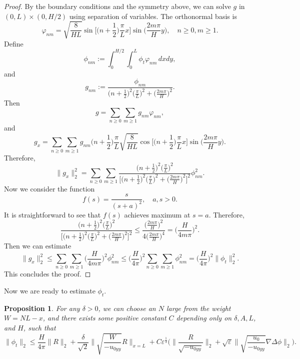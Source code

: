 \documentclass[reqno, 11pt]{amsart}
\theoremstyle{plain}
\newtheorem{proposition}[theorem]{Proposition}
\theoremstyle{definition}
\theoremstyle{remark}
\numberwithin{equation}{section}
\begin{document}
\begin{proof}
By the boundary conditions and the symmetry above, we can solve $g$ in $(0,L) \times (0, H/2)$ using separation of variables. The orthonormal basis is
$$
\varphi_{nm} = \sqrt{\frac{8}{HL}} \sin \Big[ \Big( n + \frac{1}{2} \Big) \frac{\pi}{L} x \Big] \sin \Big( \frac{2m\pi}{H} y \Big), \quad n \ge 0, m \ge 1.
$$
Define
$$
\phi_{nm}:= \int_0^{H/2} \int_0^L \phi_t \varphi_{nm} \, dx dy,
$$
and
$$
g_{nm} := \frac{\phi_{nm}}{\Big( n + \frac{1}{2} \Big)^2 \Big(\frac{\pi}{L}\Big)^2 + \Big( \frac{2m\pi}{H} \Big)^2 }.
$$
Then
$$
g = \sum_{n \ge 0} \sum_{m \ge 1} g_{nm} \varphi_{nm},
$$ 
and
$$
g_x = \sum_{n \ge 0} \sum_{m \ge 1} g_{nm} \Big( n + \frac{1}{2} \Big)  \frac{\pi}{L} \sqrt{\frac{8}{HL}} \cos \Big[ \Big( n + \frac{1}{2} \Big) \frac{\pi}{L} x \Big] \sin \Big( \frac{2m\pi}{H} y \Big).
$$
Therefore,
$$
\|g_x\|_2^2 = \sum_{n \ge 0} \sum_{m \ge 1} \frac{\Big( n + \frac{1}{2} \Big)^2 \Big(\frac{\pi}{L}\Big)^2}{\Big[ \Big( n + \frac{1}{2} \Big)^2 \Big(\frac{\pi}{L}\Big)^2 + \Big( \frac{2m\pi}{H} \Big)^2 \Big]^2} \phi_{nm}^2.
$$
Now we consider the function 
$$
f(s) = \frac{s}{(s + a)^2}, \quad a,s > 0.
$$
It is straightforward to see that $f(s)$ achieves maximum at $s = a$. Therefore,
$$
\frac{\Big( n + \frac{1}{2} \Big)^2 \Big(\frac{\pi}{L}\Big)^2}{\Big[ \Big( n + \frac{1}{2} \Big)^2 \Big(\frac{\pi}{L}\Big)^2 + \Big( \frac{2m\pi}{H} \Big)^2 \Big]^2} \le \frac{\Big( \frac{2m\pi}{H} \Big)^2}{4\Big( \frac{2m\pi}{H} \Big)^4} = \Big( \frac{H}{4m\pi}\Big)^2.
$$
Then we can estimate
$$
\|g_x\|_2^2 \le \sum_{n \ge 0} \sum_{m \ge 1} \Big( \frac{H}{4m\pi}\Big)^2 \phi_{nm}^2 \le \Big( \frac{H}{4\pi}\Big)^2 \sum_{n \ge 0} \sum_{m \ge 1} \phi_{nm}^2 = \Big( \frac{H}{4\pi}\Big)^2 \|\phi_t\|_2^2.
$$
This concludes the proof.
\end{proof}
Now we are ready to estimate $\phi_t$.
\begin{proposition}\label{prop:phi_t}
For any $\delta > 0$, we can choose an $N$ large from the weight $W = NL - x$, and there exists some positive constant $C$ depending only on $\delta, A, L$, and $H$, such that
\begin{equation}\label{est:phi_t}
\|\phi_t\|_2 \le \frac{H}{4\pi}\|R\|_2 + \frac{\delta}{\sqrt{2}} \| \sqrt{\frac{W}{-u_{0yy}}} R\|_{x= L} + C \varepsilon^{\frac{1}{3}}  \Big( \|\frac{R}{\sqrt{-u_{0yy}}}\|_2 + \sqrt{\varepsilon} \| \sqrt{\frac{u_0}{-u_{0yy}}} \nabla \Delta \phi\|_2\Big).
\end{equation}
\end{proposition}
\end{document}
